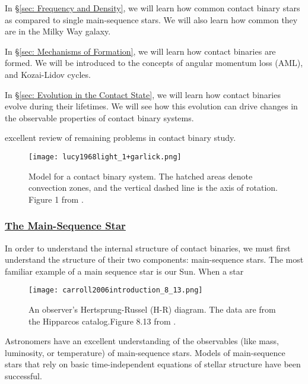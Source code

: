 \documentclass[12pt]{article} %
\numberwithin{equation}{section} %
\begin{document}
In \S \ref{sec: Frequency and Density}, we will learn how common contact binary stars as compared to single main-sequence stars. We will also learn how common they are in the Milky Way galaxy.

In \S \ref{sec: Mechanisms of Formation}, we will learn how contact binaries are formed. We will be introduced to the concepts of angular momentum loss (AML), and Kozai-Lidov cycles.

In \S \ref{sec: Evolution in the Contact State}, we will learn how contact binaries evolve during their lifetimes. We will see how this evolution can drive changes in the observable properties of contact binary systems.


\citep[p.76, ][]{webbink2003contact} excellent review of remaining problems in contact binary study. 

\begin{figure}[H]
\centering
\texttt{[image: lucy1968light\_1+garlick.png]}
\caption{Model for a contact binary system. The hatched areas denote convection zones, and the vertical dashed line is the axis of rotation. Figure 1 from \citet{lucy1968light}.}
\label{fig: lucy1968light_1}
\end{figure}

\subsubsection[The Main-Sequence Star]{\hyperlink{toc}{The Main-Sequence Star}} \label{sec: The Main-Sequence Star}



\citet{carroll2006introduction}

In order to understand the internal structure of contact binaries, we must first understand the structure of their two components: main-sequence stars. The most familiar example of a main sequence star is our Sun. When a star

\begin{figure}[H]
\centering
\texttt{[image: carroll2006introduction\_8\_13.png]}
\caption{An observer's Hertsprung-Russel (H-R) diagram. The data are from the Hipparcos catalog.Figure 8.13 from \citet{carroll2006introduction}.}
\label{fig: carroll2006introduction_8_13}
\end{figure}

Astronomers have an excellent understanding of the observables (like mass, luminosity, or temperature) of main-sequence stars. Models of main-sequence stars that rely on basic time-independent equations of stellar structure have been successful.
\end{document}
